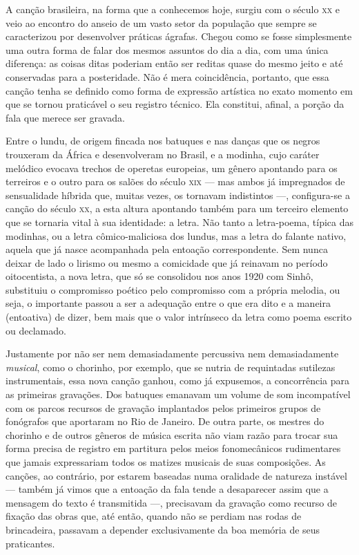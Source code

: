A canção brasileira, na forma que a conhecemos hoje, surgiu com o século
\textsc{xx} e veio ao encontro do anseio de um vasto setor da população que
sempre se caracterizou por desenvolver práticas ágrafas. Chegou como se
fosse simplesmente uma outra forma de falar dos mesmos assuntos do dia a
dia, com uma única diferença: as coisas ditas poderiam então ser reditas
quase do mesmo jeito e até conservadas para a posteridade. Não é mera
coincidência, portanto, que essa canção tenha se definido como forma de
expressão artística no exato momento em que se tornou praticável o seu
registro técnico. Ela constitui, afinal, a porção da fala que merece ser
gravada.

Entre o lundu, de origem fincada nos batuques e nas danças que os negros
trouxeram da África e desenvolveram no Brasil, e a modinha, cujo caráter
melódico evocava trechos de operetas europeias, um gênero apontando para
os terreiros e o outro para os salões do século \textsc{xix} --- mas ambos já
impregnados de sensualidade híbrida que, muitas vezes, os tornavam
indistintos ---, configura-se a canção do século \textsc{xx}, a esta altura
apontando também para um terceiro elemento que se tornaria vital à sua
identidade: a letra. Não tanto a letra-poema, típica das modinhas, ou a
letra cômico-maliciosa dos lundus, mas a letra do falante nativo, aquela
que já nasce acompanhada pela entoação correspondente. Sem nunca deixar
de lado o lirismo ou mesmo a comicidade que já reinavam no período
oitocentista, a nova letra, que só se consolidou nos anos 1920 com
Sinhô, substituiu o compromisso poético pelo compromisso com a própria
melodia, ou seja, o importante passou a ser a adequação entre o que era
dito e a maneira (entoativa) de dizer, bem mais que o valor intrínseco
da letra como poema escrito ou declamado.

Justamente por não ser nem demasiadamente percussiva nem demasiadamente
\textit{musical}, como o chorinho, por exemplo, que se nutria de requintadas
sutilezas instrumentais, essa nova canção ganhou, como já expusemos, a
concorrência para as primeiras gravações. Dos batuques emanavam um
volume de som incompatível com os parcos recursos de gravação
implantados pelos primeiros grupos de fonógrafos que aportaram no Rio de
Janeiro. De outra parte, os mestres do chorinho e de outros gêneros de
música escrita não viam razão para trocar sua forma precisa de registro
em partitura pelos meios fonomecânicos rudimentares que jamais
expressariam todos os matizes musicais de suas composições. As canções,
ao contrário, por estarem baseadas numa oralidade de natureza instável
 --- também já vimos que a entoação da fala tende a desaparecer assim que a
mensagem do texto é transmitida ---, precisavam da gravação como recurso de
fixação das obras que, até então, quando não se perdiam nas rodas de
brincadeira, passavam a depender exclusivamente da boa memória de seus
praticantes.


